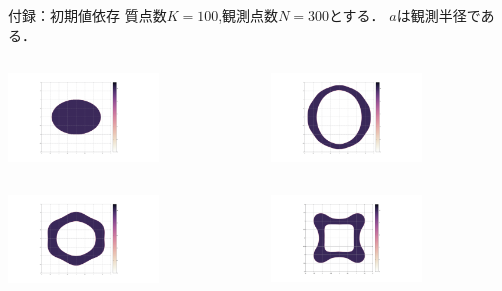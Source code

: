 \documentclass[dvipdfmx]{beamer}
\theoremstyle{remark}
\begin{document}
\begin{frame}[noframenumbering]{付録：初期値依存}
  質点数$K=100$,観測点数$N=300$とする．
  $a$は観測半径である．

  \begin{columns}
    \begin{column}{0.38\columnwidth}
      \centering
      \includegraphics[width=4cm]{fig/elliptic.png}
      \captionsetup[figure]{labelformat=empty,labelsep=none}
    \end{column}
    \hspace{-1cm}
    \begin{column}{0.38\columnwidth}
      \centering
      \includegraphics[width=4cm]{fig/GN300K100R4E2.png}
      \captionsetup[figure]{labelformat=empty,labelsep=none}
    \end{column}
  \end{columns}

  \begin{columns}
    \begin{column}{0.38\columnwidth}
      \centering
      \includegraphics[width=4cm]{fig/GN300K100R10E2.png}
      \captionsetup[figure]{labelformat=empty,labelsep=none}
    \end{column}
    \hspace{-1cm}
    \begin{column}{0.38\columnwidth}
      \centering
      \includegraphics[width=4cm]{fig/GN300K100R30E2.png}
      \captionsetup[figure]{labelformat=empty,labelsep=none}
    \end{column}
  \end{columns}


\end{frame}
\end{document}
